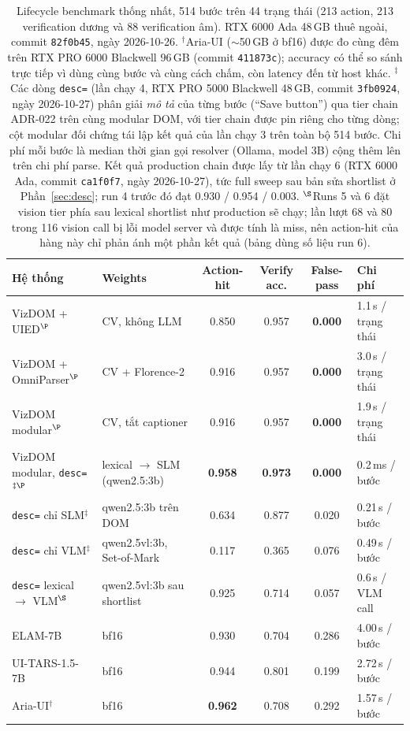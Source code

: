 \documentclass[11pt,a4paper]{article}
\newcommand{\code}[1]{\texttt{#1}}
\begin{document}
\begin{table}[H]
  \centering\footnotesize
  \caption{Lifecycle benchmark thống nhất, 514 bước trên 44 trạng thái (213 action,
  213 verification dương và 88 verification âm). RTX 6000 Ada 48\,GB thuê ngoài,
  commit \code{82f0b45}, ngày 2026-10-26. $^\dagger$Aria-UI ($\sim$50\,GB ở bf16)
  được đo cùng đêm trên RTX PRO 6000 Blackwell 96\,GB (commit \code{411873c});
  accuracy có thể so sánh trực tiếp vì dùng cùng bước và cùng cách chấm, còn latency
  đến từ host khác. $^\ddagger$Các dòng \code{desc=} (lần chạy 4, RTX PRO 5000
  Blackwell 48\,GB, commit \code{3fb0924}, ngày 2026-10-27) phân giải \emph{mô tả}
  của từng bước (``Save button'') qua tier chain ADR-022 trên cùng modular DOM,
  với tier chain được pin riêng cho từng dòng; cột modular đối chứng tái lập kết quả
  của lần chạy 3 trên toàn bộ 514 bước. Chi phí mỗi bước là median thời gian gọi
  resolver (Ollama, model 3B) cộng thêm lên trên chi phí parse. Kết quả production
  chain được lấy từ lần chạy 6 (RTX 6000 Ada, commit \code{ca1f0f7}, ngày 2026-10-27),
  tức full sweep sau bản sửa shortlist ở Phần~\ref{sec:desc}; run 4 trước đó đạt
  0.930 / 0.954 / 0.003. $^\S$Runs 5 và 6 đặt vision tier phía sau lexical shortlist
  như production sẽ chạy; lần lượt 68 và 80 trong 116 vision call bị lỗi model server
  và được tính là miss, nên action-hit của hàng này chỉ phản ánh một phần kết quả
  (bảng dùng số liệu run 6).}
  \label{tab:lifecycle}
  \begin{tabular}{@{}p{3.4cm}p{2.5cm}cccp{2.6cm}@{}}
    \toprule
    Hệ thống & Weights & Action-hit & Verify acc. & False-pass & Chi phí \\
    \midrule
    VizDOM + UIED$^\P$ & CV, không LLM & 0.850 & 0.957 & \textbf{0.000} & 1.1\,s / trạng thái \\
    VizDOM + OmniParser$^\P$ & CV + Florence-2 & 0.916 & 0.957 & \textbf{0.000} & 3.0\,s / trạng thái \\
    VizDOM modular$^\P$ & CV, tắt captioner & 0.916 & 0.957 & \textbf{0.000} & 1.9\,s / trạng thái \\
    VizDOM modular, \code{desc=}$^{\ddagger\P}$ & lexical $\rightarrow$ SLM (qwen2.5:3b) & \textbf{0.958} & \textbf{0.973} & \textbf{0.000} & 0.2\,ms / bước \\
    \quad \code{desc=} chỉ SLM$^\ddagger$ & qwen2.5:3b trên DOM & 0.634 & 0.877 & 0.020 & 0.21\,s / bước \\
    \quad \code{desc=} chỉ VLM$^\ddagger$ & qwen2.5vl:3b, Set-of-Mark & 0.117 & 0.365 & 0.076 & 0.49\,s / bước \\
    \quad \code{desc=} lexical $\rightarrow$ VLM$^\S$ & qwen2.5vl:3b sau shortlist & 0.925 & 0.714 & 0.057 & 0.6\,s / VLM call \\
    ELAM-7B & bf16 & 0.930 & 0.704 & 0.286 & 4.00\,s / bước \\
    UI-TARS-1.5-7B & bf16 & 0.944 & 0.801 & 0.199 & 2.72\,s / bước \\
    Aria-UI$^\dagger$ & bf16 & \textbf{0.962} & 0.708 & 0.292 & 1.57\,s / bước \\
    \bottomrule
  \end{tabular}
\end{table}
\end{document}
